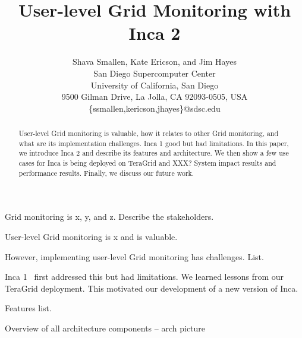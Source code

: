 \documentclass[times, 10pt,twocolumn]{article}
\begin{document}
\title{User-level Grid Monitoring with Inca 2}

\author{Shava Smallen, Kate Ericson, and Jim Hayes \\
San Diego Supercomputer Center\\ University of California, San Diego\\ 
9500 Gilman Drive, La Jolla, CA 92093-0505, USA\\ 
\{ssmallen,kericson,jhayes\}@sdsc.edu\\
}

\maketitle
\thispagestyle{empty}

\begin{abstract}
User-level Grid monitoring is valuable, how it relates to other Grid
monitoring,  and what are its implementation challenges.
Inca 1 good but had limitations.  In this paper, we introduce Inca 2 and
describe its features and architecture.  We then show a few use cases for Inca
is being deployed on TeraGrid and XXX?  System impact results and performance
results.  Finally, we discuss our future work.  
\end{abstract}



Grid monitoring is x, y, and z.  Describe the stakeholders.

User-level Grid monitoring is x and is valuable.  

However, implementing user-level Grid monitoring has challenges.  List.

Inca 1~\cite{inca1} first addressed this but had limitations.  We learned
lessons from our TeraGrid deployment.  This motivated our development of a new
version of Inca.



Features list.

Overview of all architecture components -- arch picture
\end{document}
